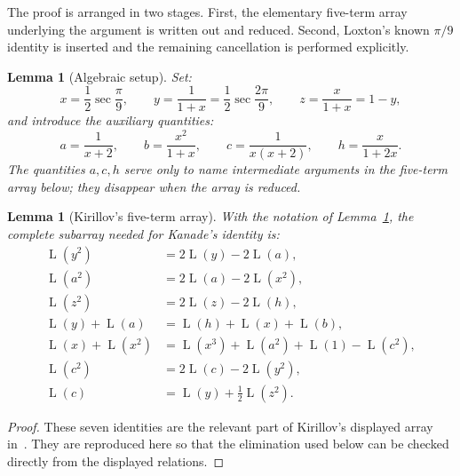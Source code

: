 \documentclass[preprint,12pt,number]{elsarticle}
\newtheorem{lemma}[theorem]{Lemma}
\theoremstyle{remark}
\newcommand{\Lr}{\operatorname{L}}
\begin{document}
The proof is arranged in two stages.  First, the elementary five-term array
underlying the argument is written out and reduced.  Second, Loxton's known
$\pi/9$ identity is inserted and the remaining cancellation is performed
explicitly.

\begin{lemma}[Algebraic setup]\label{lem:algsetup}
Set:
\begin{equation}\label{eq:xyz}
x=\frac12\sec\frac{\pi}{9},\qquad
y=\frac{1}{1+x}=\frac12\sec\frac{2\pi}{9},\qquad
z=\frac{x}{1+x}=1-y,
\end{equation}
and introduce the auxiliary quantities:
\begin{equation}\label{eq:aux}
a=\frac{1}{x+2},\qquad
b=\frac{x^2}{1+x},\qquad
c=\frac{1}{x(x+2)},\qquad
h=\frac{x}{1+2x}.
\end{equation}
The quantities $a,c,h$ serve only to name intermediate arguments in the
five-term array below; they disappear when the array is reduced.
\end{lemma}

\begin{lemma}[Kirillov's five-term array]\label{lem:kirarray}
With the notation of Lemma~\ref{lem:algsetup}, the complete subarray needed
for Kanade's identity is:
\begin{align}
\Lr(y^2)&=2\Lr(y)-2\Lr(a),\label{eq:k12}\\
\Lr(a^2)&=2\Lr(a)-2\Lr(x^2),\label{eq:k13}\\
\Lr(z^2)&=2\Lr(z)-2\Lr(h),\label{eq:k14}\\
\Lr(y)+\Lr(a)&=\Lr(h)+\Lr(x)+\Lr(b),\label{eq:k15}\\
\Lr(x)+\Lr(x^2)&=\Lr(x^3)+\Lr(a^2)+\Lr(1)-\Lr(c^2),\label{eq:k16}\\
\Lr(c^2)&=2\Lr(c)-2\Lr(y^2),\label{eq:k17}\\
\Lr(c)&=\Lr(y)+\frac12\Lr(z^2).\label{eq:k18}
\end{align}
\end{lemma}

\begin{proof}
These seven identities are the relevant part of Kirillov's displayed array
in~\cite[\S1.2.2, pp.~78--79]{Kirillov}.  They are reproduced here so that
the elimination used below can be checked directly from the displayed
relations.
\end{proof}
\end{document}
